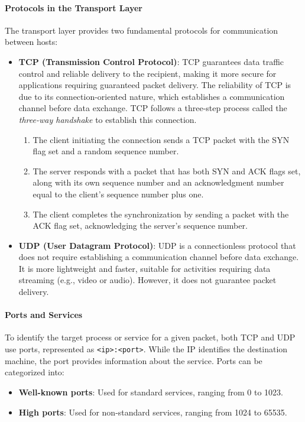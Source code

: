 \paragraph{Protocols in the Transport Layer}
The transport layer provides two fundamental protocols for communication between hosts:
\begin{itemize}
    \item \textbf{TCP (Transmission Control Protocol)}: TCP guarantees data traffic control and reliable delivery to the recipient, making it more secure for applications requiring guaranteed packet delivery. The reliability of TCP is due to its connection-oriented nature, which establishes a communication channel before data exchange. TCP follows a three-step process called the \textit{three-way handshake} to establish this connection.
    \begin{enumerate}
        \item The client initiating the connection sends a TCP packet with the SYN flag set and a random sequence number.
        \item The server responds with a packet that has both SYN and ACK flags set, along with its own sequence number and an acknowledgment number equal to the client's sequence number plus one.
        \item The client completes the synchronization by sending a packet with the ACK flag set, acknowledging the server's sequence number.
    \end{enumerate}
    \item \textbf{UDP (User Datagram Protocol)}: UDP is a connectionless protocol that does not require establishing a communication channel before data exchange. It is more lightweight and faster, suitable for activities requiring data streaming (e.g., video or audio). However, it does not guarantee packet delivery.
\end{itemize}


\paragraph{Ports and Services}
To identify the target process or service for a given packet, both TCP and UDP use ports, represented as \texttt{<ip>:<port>}. While the IP identifies the destination machine, the port provides information about the service. Ports can be categorized into:

\begin{itemize}
    \item \textbf{Well-known ports}: Used for standard services, ranging from 0 to 1023.
    \item \textbf{High ports}: Used for non-standard services, ranging from 1024 to 65535.
\end{itemize}

